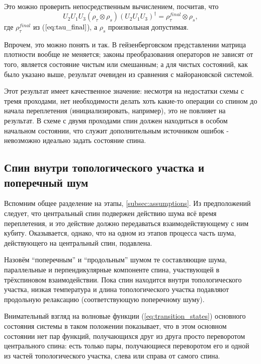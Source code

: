 \documentclass[a4paper,12pt]{article}
\theoremstyle{plain} %
\theoremstyle{definition} %
\theoremstyle{remark} %
\begin{document}
Это можно проверить непосредственным вычислением, посчитав, что
\begin{equation}
    U_2 U_1 U_3 (\rho_\tau \otimes \rho_s) (U_2 U_1 U_3)^\dagger = \rho^{final}_\tau \otimes \rho_s
    \label{eq:u213_general},
\end{equation}
где $\rho^{final}_\tau$ из ($\ref{eq:tau_final}$), а $\rho_s$ произвольная допустимая.

Впрочем, это можно понять и так. В гейзенберговском представлении матрица плотности вообще не меняется; законы преобразования операторов не зависят от того, является состояние чистым или смешанным; а для чистых состояний, как было указано выше, результат очевиден из сравнения с майорановской системой.

Этот результат имеет качественное значение: несмотря на недостатки схемы с тремя проходами, нет необходимости делать хоть какие-то операции со спином до начала переплетения (инициализировать, например), это не повлияет на результат. 
В схеме с двумя проходами спин должен находиться в особом начальном состоянии, что служит дополнительным источником ошибок - невозможно идеально задать состояние спина.

\subsection{Спин внутри топологического участка и поперечный шум} \label{subsec:inside_transverse}

Вспомним общее разделение на этапы, \ref{subsec:assumptions}. 
Из предположений следует, что центральный спин подвержен действию шума всё время переплетения, и это действие должно передаваться взаимодействующему с ним кубиту. Оказывается, однако, что на одном из этапов процесса часть шума, действующего на центральный спин, подавлена.

Назовём ``поперечным'' и ``продольным'' шумом те составляющие шума, параллельные и перпендикулярные компоненте спина, участвующей в трёхспиновом взаимодействии.
Пока спин находится внутри топологического участка, низкая температура и длина топологического участка подавляют продольную релаксацию (соответствующую поперечному шуму).

Внимательный взгляд на волновые функции (\ref{eq:transition_states}) основного состояния системы в таком положении показывает, что в этом основном состоянии нет пар функций, получающихся друг из друга просто переворотом центрального спина: есть только пары, получающиеся переворотом его и одной из частей топологического участка, слева или справа от самого спина.
\end{document}
